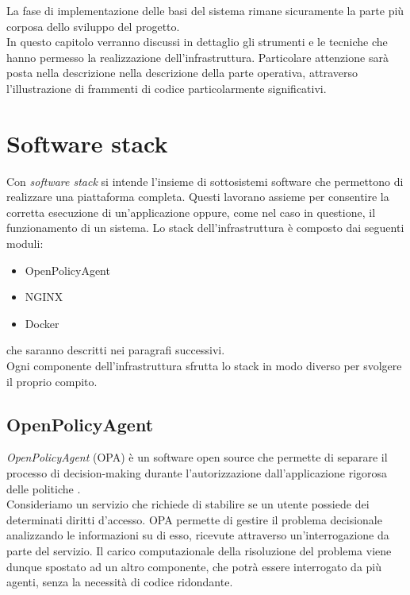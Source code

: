 La fase di implementazione delle basi del sistema rimane sicuramente la parte più corposa dello sviluppo del progetto.
\\ In questo capitolo verranno discussi in dettaglio gli strumenti e le tecniche
che hanno permesso la realizzazione dell'infrastruttura. Particolare attenzione sarà posta nella descrizione 
nella descrizione della parte operativa, attraverso l'illustrazione di frammenti di codice particolarmente significativi. 

\section{Software stack}
Con \textit{software stack} si intende l'insieme di sottosistemi software che permettono di realizzare una piattaforma completa.
Questi lavorano assieme per consentire la corretta esecuzione di un'applicazione oppure, come nel caso in questione, il 
funzionamento di un sistema.
Lo stack dell'infrastruttura è composto dai seguenti moduli:
\begin{itemize}
    \item OpenPolicyAgent
    \item NGINX
    \item Docker
\end{itemize}
che saranno descritti nei paragrafi successivi.
\\ Ogni componente dell'infrastruttura sfrutta lo stack in modo diverso per svolgere il proprio compito. 


\subsection{OpenPolicyAgent}
\textit{OpenPolicyAgent} (OPA) \cite{opa_bib} è un software open source che permette di separare il processo di
 decision-making 
durante l'autorizzazione dall'applicazione rigorosa delle politiche \cite{opa_doc}.
\\ Consideriamo un servizio che richiede di stabilire se un utente possiede dei determinati diritti d'accesso.
OPA permette di gestire il problema decisionale analizzando le informazioni su di esso, ricevute attraverso un'interrogazione da parte del servizio. 
Il carico computazionale della risoluzione del problema viene dunque spostato ad un altro componente, che potrà essere interrogato da più 
agenti, senza la necessità di codice ridondante. 

